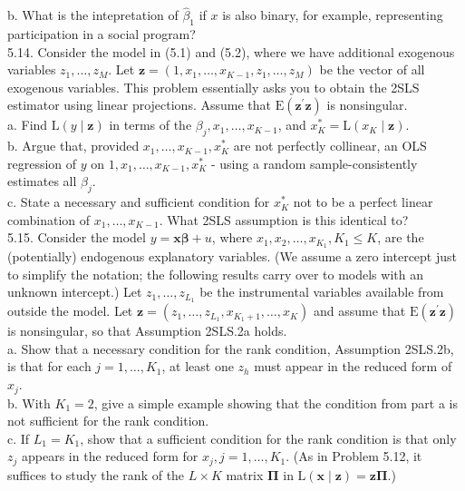 \documentclass[10pt]{article}
\begin{document}
b. What is the intepretation of $\hat{\beta}_{1}$ if $x$ is also binary, for example, representing participation in a social program?\\
5.14. Consider the model in (5.1) and (5.2), where we have additional exogenous variables $z_{1}, \ldots, z_{M}$. Let $\mathbf{z}=\left(1, x_{1}, \ldots, x_{K-1}, z_{1}, \ldots, z_{M}\right)$ be the vector of all exogenous variables. This problem essentially asks you to obtain the 2SLS estimator using linear projections. Assume that $\mathrm{E}\left(\mathbf{z}^{\prime} \mathbf{z}\right)$ is nonsingular.\\
a. Find $\mathrm{L}(y \mid \mathbf{z})$ in terms of the $\beta_{j}, x_{1}, \ldots, x_{K-1}$, and $x_{K}^{*}=\mathrm{L}\left(x_{K} \mid \mathbf{z}\right)$.\\
b. Argue that, provided $x_{1}, \ldots, x_{K-1}, x_{K}^{*}$ are not perfectly collinear, an OLS regression of $y$ on $1, x_{1}, \ldots, x_{K-1}, x_{K}^{*}$ - using a random sample-consistently estimates all $\beta_{j}$.\\
c. State a necessary and sufficient condition for $x_{K}^{*}$ not to be a perfect linear combination of $x_{1}, \ldots, x_{K-1}$. What 2SLS assumption is this identical to?\\
5.15. Consider the model $y=\mathbf{x} \boldsymbol{\beta}+u$, where $x_{1}, x_{2}, \ldots, x_{K_{1}}, K_{1} \leq K$, are the (potentially) endogenous explanatory variables. (We assume a zero intercept just to simplify the notation; the following results carry over to models with an unknown intercept.) Let $z_{1}, \ldots, z_{L_{1}}$ be the instrumental variables available from outside the model. Let $\mathbf{z}=\left(z_{1}, \ldots, z_{L_{1}}, x_{K_{1}+1}, \ldots, x_{K}\right)$ and assume that $\mathrm{E}\left(\mathbf{z}^{\prime} \mathbf{z}\right)$ is nonsingular, so that Assumption 2SLS.2a holds.\\
a. Show that a necessary condition for the rank condition, Assumption 2SLS.2b, is that for each $j=1, \ldots, K_{1}$, at least one $z_{h}$ must appear in the reduced form of $x_{j}$.\\
b. With $K_{1}=2$, give a simple example showing that the condition from part a is not sufficient for the rank condition.\\
c. If $L_{1}=K_{1}$, show that a sufficient condition for the rank condition is that only $z_{j}$ appears in the reduced form for $x_{j}, j=1, \ldots, K_{1}$. (As in Problem 5.12, it suffices to study the rank of the $L \times K$ matrix $\boldsymbol{\Pi}$ in $\mathrm{L}(\mathbf{x} \mid \mathbf{z})=\mathbf{z} \boldsymbol{\Pi}$.)\\
\end{document}
